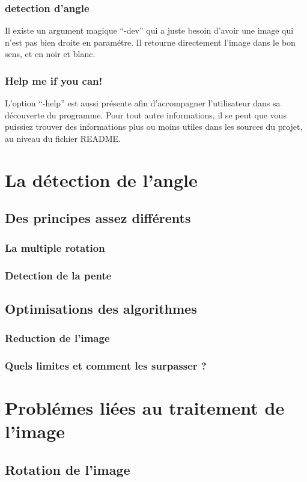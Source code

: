 \subsection{ detection d'angle}
 Il existe un argument magique ``-dev'' qui a juste besoin d'avoir une
 image qui n'est pas bien droite en param\'etre. Il retourne directement
 l'image dans le bon sens, et en noir et blanc.
\subsection{ Help me if you can! }
 L'option ``-help'' est aussi pr\'esente afin d'accompagner
 l'utilisateur dans sa d\'ecouverte du programme. Pour tout autre
 informations, il se peut que vous puissiez trouver des informations
 plus ou moins utiles dans les sources du projet, au niveau du fichier
 README.

\chapter{ La d\'etection de l'angle }

\section{ Des principes assez diff\'erents}
\subsection{ La multiple rotation }
\subsection{ Detection de la pente }
\section{ Optimisations des algorithmes }
\subsection{ Reduction de l'image }
\subsection{ Quels limites et comment les surpasser ? }
\chapter{ Probl\'emes li\'ees au traitement de l'image }
\section{ Rotation de l'image}
